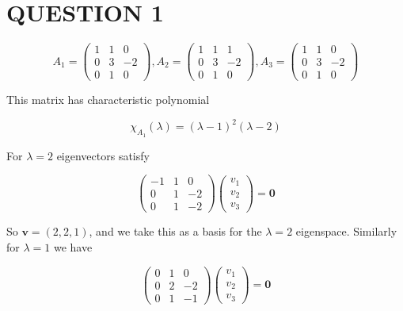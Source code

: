 \documentclass[a4paper]{article}
\begin{document}
	
\maketitle
	
\section{QUESTION 1}


\[ A_{1} = \begin{pmatrix}
1 & 1 & 0 \\
0 & 3 & -2\\
0 & 1 & 0
\end{pmatrix}, A_{2} = \begin{pmatrix}
1 & 1 & 1 \\
0 & 3 & -2\\
0 & 1 & 0
\end{pmatrix}, A_{3} = \begin{pmatrix}
1 & 1 & 0 \\
0 & 3 & -2\\
0 & 1 & 0
\end{pmatrix} \]

This matrix has characteristic polynomial

\[ \chi_{A_{1}}(\lambda) = (\lambda - 1)^{2} (\lambda - 2) \]


For $ \lambda = 2 $ eigenvectors satisfy

\[ \begin{pmatrix}
-1 & 1 & 0 \\
0 & 1 & -2\\
0 & 1 & -2
\end{pmatrix} \begin{pmatrix}
v_{1} \\
v_{2} \\
v_{3}
\end{pmatrix} = \mathbf{0} \]

So $ \mathbf{v} = (2,2,1) $, and we take this as a basis for the $ \lambda = 2 $ eigenspace. Similarly for $ \lambda= 1 $ we have

\[ \begin{pmatrix}
0 & 1 & 0 \\
0 & 2 & -2\\
0 & 1 & -1
\end{pmatrix} \begin{pmatrix}
v_{1} \\
v_{2} \\
v_{3}
\end{pmatrix} = \mathbf{0} \]
\end{document}

